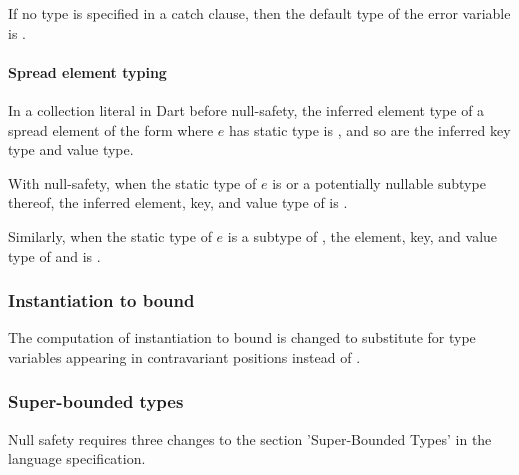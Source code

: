 \documentclass[makeidx]{article}
\begin{document}
{

If no type is specified in a catch clause, then the default type of the error
variable is .

\paragraph{Spread element typing}

In a collection literal in Dart before null-safety, the inferred element
type of a spread element of the form  where $e$ has static type
 is , and so are the inferred key type and value type.

With null-safety, when the static type of $e$ is  or a potentially
nullable subtype thereof, the inferred element, key, and value type
of  is .

Similarly, when the static type of $e$ is a subtype of ,
the element, key, and value type of  and  is .


\subsubsection{Instantiation to bound}

The computation of instantiation to bound is changed to substitute  for
type variables appearing in contravariant positions instead of .

\subsubsection{Super-bounded types}

Null safety requires three changes to the section 'Super-Bounded Types' in
the language specification.

}
\end{document}
